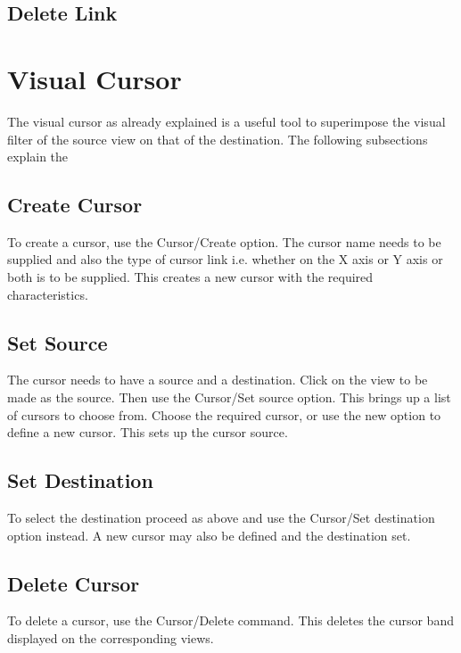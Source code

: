 \subsection{Delete Link}


\section{Visual Cursor}

The visual cursor as already explained is a useful tool to superimpose
the visual filter of the source view on that of the destination. The
following subsections explain the

\subsection{Create Cursor}

To create a cursor, use the Cursor/Create option. The cursor name needs
to be supplied and also the type of cursor link i.e. whether on the X
axis or Y axis or both is to be supplied. This creates a new cursor
with the required characteristics.

\subsection{Set Source}

The cursor needs to have a source and a destination. Click on the view
to be made as the source. Then use the Cursor/Set source option. This
brings up a list of cursors to choose from. Choose the required
cursor, or use the new option to define a new cursor. This sets up the
cursor source.

\subsection{Set Destination}

To select the destination proceed as above and use the Cursor/Set
destination option instead. A new cursor may also be defined and the
destination set.

\subsection{Delete Cursor}

To delete a cursor, use the Cursor/Delete command. This deletes the
cursor band displayed on the corresponding views.

